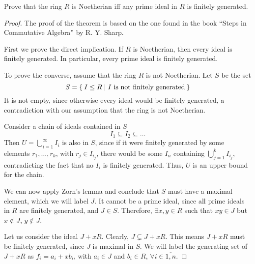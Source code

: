 \begin{problem}[Cohen]
Prove that the ring \(R\) is Noetherian iff any prime ideal in \(R\) is finitely generated.
\end{problem}
\begin{proof}
The proof of the theorem is based on the one found in the book ``Steps in Commutative Algebra'' by R. Y. Sharp.

First we prove the direct implication. If \(R\) is Noetherian, then every ideal is finitely generated. In particular, every prime ideal is finitely generated.

To prove the converse, assume that the ring \(R\) is not Noetherian. Let \(S\) be the set
\[
    S = \Set{ I \leq R \mid I \text{ is not finitely generated} }
\]
It is not empty, since otherwise every ideal would be finitely generated, a contradiction with our assumption that the ring is not Noetherian.

Consider a chain of ideals contained in \(S\)
\[
    I_1 \subseteq I_2 \subseteq \dots
\]
Then \(U = \bigcup_{i = 1}^{\infty} I_i\) is also in \(S\), since if it were finitely generated by some elements \(r_1, \dots, r_k\), with \(r_j \in I_{i_j}\), there would be some \(I_n\) containing \(\bigcup_{j = 1}^{k} I_{i_j}\), contradicting the fact that no \(I_i\) is finitely generated. Thus, \(U\) is an upper bound for the chain.

We can now apply Zorn's lemma and conclude that \(S\) must have a maximal element, which we will label \(J\). It cannot be a prime ideal, since all prime ideals in \(R\) are finitely generated, and \(J \in S\). Therefore, \(\exists x, y \in R\) such that \(x y \in J\) but \(x \not\in J\), \(y \not\in J\).

Let us consider the ideal \(J + xR\). Clearly, \(J \subsetneq J + xR\). This means \(J + xR\) must be finitely generated, since \(J\) is maximal in \(S\). We will label the generating set of \(J + xR\) as \(f_i = a_i + x b_i\), with \(a_i \in J\) and \(b_i \in R\), \(\forall i \in \overline{1, n}\).


\end{proof}
